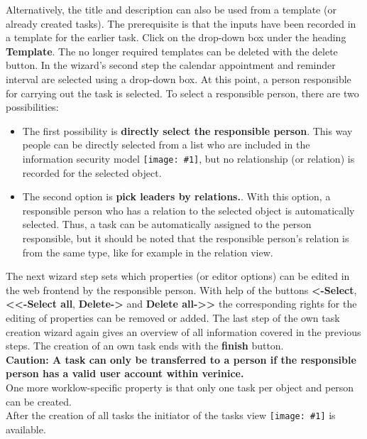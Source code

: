 \documentclass[a4paper,10pt]{book}
\newcommand{\icon}[1]{\texttt{[image: \#1]}}
\begin{document}
Alternatively, the title and description can also be used from a template (or already created tasks). The prerequisite is that the inputs have been recorded in a template for the earlier task. Click on the drop-down box under the heading \textbf{Template}.
The no longer required templates can be deleted with the delete button.
In the wizard's second step the calendar appointment and reminder interval are selected using a drop-down box. At this point, a person responsible for carrying out the task is selected.
To select a responsible person, there are two possibilities:
\begin{itemize}
\item The first possibility is \textbf{directly select the responsible person}. This way people can be directly selected from a list who are included in the information security model \icon{Icon/Informationssicherheitsmodell.png},  but no relationship (or relation) is recorded for the selected object.
\item The second option is \textbf{pick leaders by relations.}.
With this option, a responsible person who has a relation to the selected object is automatically selected. Thus, a task can be automatically assigned to the person responsible, but it should be noted that the responsible person's relation is from the same type, like for example in the relation view.
\end{itemize}
The next wizard step sets which properties (or editor options) can be edited in the web frontend by the responsible person.
With help of the buttons \textbf{\textless-Select}, \textbf{\textless\textless-Select all}, \textbf{Delete-\textgreater} and \textbf{Delete all-\textgreater\textgreater} the corresponding rights for the editing of properties can be removed or added.
The last step of the own task creation wizard again gives an overview of all information covered in the previous steps.
The creation of an own task ends with the \textbf{finish} button.
\newline\\
\textbf{Caution: A task can only be transferred to a person if the responsible person has a valid user account within verinice.}
\newline\\
One more worklow-specific property is that only one task per object and person can be created.
\newline\\
After the creation of all tasks the initiator of the tasks view  \icon{Icon/Tasks.png} is available.
\end{document}
